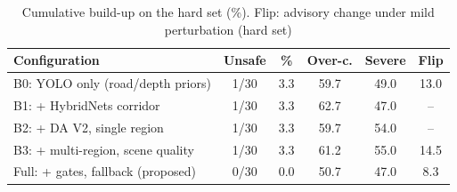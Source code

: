 \begin{table}[t]
\centering
\caption{Cumulative build-up on the hard set (\%). Flip: advisory change under mild perturbation (hard set)}
\label{tab:buildup_hard}
\footnotesize
\setlength{\tabcolsep}{3pt}
\begin{tabular}{lccccc}
\hline
Configuration & Unsafe & \% & Over-c. & Severe & Flip \\
\hline
B0: YOLO only (road/depth priors) & 1/30 & 3.3 & 59.7 & 49.0 & 13.0 \\
B1: + HybridNets corridor & 1/30 & 3.3 & 62.7 & 47.0 & -- \\
B2: + DA V2, single region & 1/30 & 3.3 & 59.7 & 54.0 & -- \\
B3: + multi-region, scene quality & 1/30 & 3.3 & 61.2 & 55.0 & 14.5 \\
Full: + gates, fallback (proposed) & 0/30 & 0.0 & 50.7 & 47.0 & 8.3 \\
\hline
\end{tabular}
\end{table}
